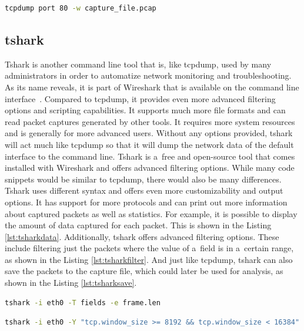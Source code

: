 \documentclass[
  printed,     %
  color,       %
  oneside,     %
  nosansbold,  %
  nocolorbold, %
  nolof,         %
  nolot,         %
]{fithesis4}
\begin{document}
\begin{lstlisting}[language=bash, caption={Filter the traffic on the port 80, save it to the specified file}, label={lst:file}]
tcpdump port 80 -w capture_file.pcap
\end{lstlisting}

\subsection{tshark}

Tshark is another command line tool that is, like tcpdump, used by many administrators in order to automatize network monitoring and troubleshooting. As its name reveals, it is part of Wireshark that is available on the command line interface~\cite{tshark112:online}. Compared to tcpdump, it provides even more advanced filtering options and scripting capabilities. It supports much more file formats and can read packet captures generated by other tools. It requires more system resources and is generally for more advanced users. Without any options provided, tshark will act much like tcpdump so that it will dump the network data of the default interface to the command line. Tshark is a~free and open-source tool that comes installed with Wireshark and offers advanced filtering options. While many code snippets would be similar to tcpdump, there would also be many differences. Tshark uses different syntax and offers even more customizability and output options. It has support for more protocols and can print out more information about captured packets as well as statistics. For example, it is possible to display the amount of data captured for each packet. This is shown in the Listing \ref{lst:tsharkdata}. Additionally, tshark offers advanced filtering options. These include filtering just the packets where the value of a~field is in a~certain range, as shown in the Listing \ref{lst:tsharkfilter}. And just like tcpdump, tshark can also save the packets to the capture file, which could later be used for analysis, as shown in the Listing \ref{lst:tsharksave}.

\begin{lstlisting}[language=bash, caption={Display amount of data captured per packet}, label={lst:tsharkdata}]
tshark -i eth0 -T fields -e frame.len
\end{lstlisting}

\begin{lstlisting}[language=bash, caption={Filter by the value in a~certain range}, label={lst:tsharkfilter}]
tshark -i eth0 -Y "tcp.window_size >= 8192 && tcp.window_size < 16384"
\end{lstlisting}
\end{document}
